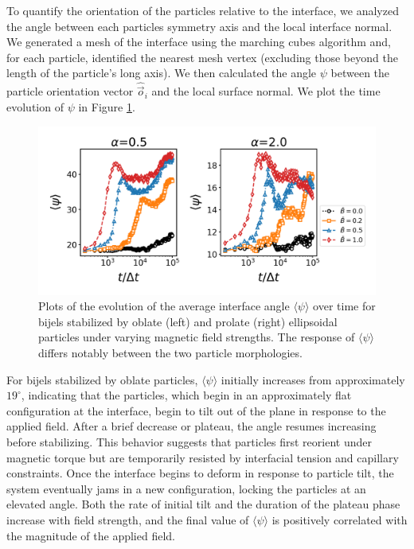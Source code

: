 To quantify the orientation of the particles relative to the interface, we analyzed the angle between each particles symmetry axis and 
the local interface normal. We generated a mesh of the interface using the marching cubes algorithm and, for each particle, identified the nearest mesh vertex 
(excluding those beyond the length of the particle's long axis). We then calculated the angle \(\psi\) between the particle orientation vector 
\(\hat{\vec{o}}_i\) and the local surface normal. We plot the time evolution of $\psi$ in Figure \ref{fig:interface_angle-field_on}.

\begin{figure} 
    \centering 
    \includegraphics[scale=0.5]{../figures/results/paper2/psi-field_on.png} 
    \caption{Plots of the evolution of the average interface angle \(\langle \psi \rangle\) over time for bijels stabilized 
             by oblate (left) and prolate (right) ellipsoidal particles under varying magnetic field strengths. The response of \(\langle \psi \rangle\) 
             differs notably between the two particle morphologies.} 
    \label{fig:interface_angle-field_on} 
\end{figure}

For bijels stabilized by oblate particles, \(\langle \psi \rangle\) initially increases from approximately \(19^\circ\), indicating that the particles, which begin 
in an approximately flat configuration at the interface, begin to tilt out of the plane in response to the applied field. After a brief decrease or plateau, the angle 
resumes increasing before stabilizing. This behavior suggests that particles first reorient under magnetic torque but are temporarily resisted by interfacial tension 
and capillary constraints. Once the interface begins to deform in response to particle tilt, the system eventually jams in a new configuration, locking the particles 
at an elevated angle. Both the rate of initial tilt and the duration of the plateau phase increase with field strength, and the final value of 
\(\langle \psi \rangle\) is positively correlated with the magnitude of the applied field.

